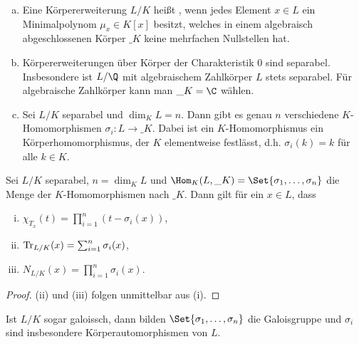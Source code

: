 \begin{nt} \label{8.4}
	\begin{enumerate}[a)]
		\item
			Eine Körpererweiterung $L / K$ heißt , wenn jedes Element $x \in L$ ein Minimalpolynom $\mu_x \in K[x]$ besitzt, welches in einem algebraisch abgeschlossenen Körper $\_K$ keine mehrfachen Nullstellen hat.
		\item
			Körpererweiterungen über Körper der Charakteristik 0 sind separabel.
			Insbesondere ist $L / \Q$ mit algebraischem Zahlkörper $L$ stets separabel.
			Für algebraische Zahlkörper kann man $\_K = \C$ wählen.
		\item
			Sei $L / K$ separabel und $\dim_K L = n$.
			Dann gibt es genau $n$ verschiedene $K$-Homomorphismen $\sigma_i: L \to \_K$.
			Dabei ist ein $K$-Homomorphismus ein Körperhomomorphismus, der $K$ elementweise festlässt, d.h. $\sigma_i(k) = k$ für alle $k \in K$.
	\end{enumerate}
\end{nt}

\begin{st} \label{8.5}
	Sei $L / K$ separabel, $n = \dim_K L$ und $\Hom_K(L, \_K) = \Set{\sigma_1, \dotsc, \sigma_n}$ die Menge der $K$-Homomorphismen nach $\_K$.
	Dann gilt für ein $x \in L$, dass
	\begin{enumerate}[(i)]
		\item
			$\chi_{T_x}(t) = \prod_{i=1}^n (t - \sigma_i(x))$,
		\item
			$\operatorname{Tr}_{L/K}(x) = \sum_{i=1}^n \sigma_i(x)$,
		\item
			$N_{L/K}(x) = \prod_{i=1}^n \sigma_i(x)$.
	\end{enumerate}
	\begin{proof}
		(ii) und (iii) folgen unmittelbar aus (i).
	\end{proof}
	\begin{note}
		Ist $L / K$ sogar galoissch, dann bilden $\Set{\sigma_1, \dotsc, \sigma_n}$ die Galoisgruppe und $\sigma_i$ sind insbesondere Körperautomorphismen von $L$.
	\end{note}
\end{st}
